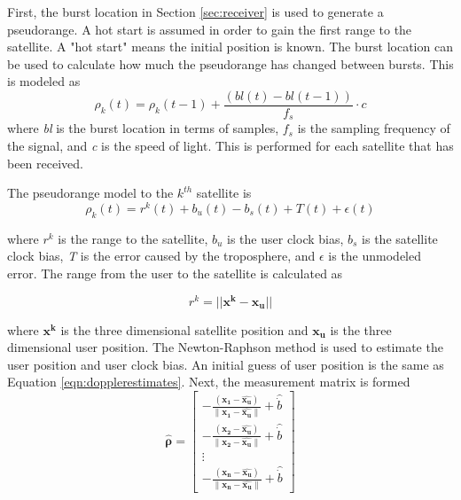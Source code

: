\documentclass[12pt]{report}
\begin{document}
First, the burst location in Section \ref{sec:receiver} is used to generate a pseudorange. A hot start is assumed in order to gain the first range to the satellite. A "hot start" means the initial position is known. The burst location can be used to calculate how much the pseudorange has changed between bursts. This is modeled as 
\begin{equation}
    \rho_{k}(t) = \rho_{k}(t-1) + \frac{(bl(t) - bl(t-1))}{f_s} \cdot c
    \label{eqn:pseudocalc}
\end{equation}
where \textit{bl} is the burst location in terms of samples, $f_s$ is the sampling frequency of the signal, and \textit{c} is the speed of light. This is performed for each satellite that has been received.

The pseudorange model to the $k^{th}$ satellite is 
\begin{equation}
    \rho_k(t) = r^k(t) + b_u(t) - b_s(t) + T(t) + \epsilon(t)
\end{equation}

where $r^k$ is the range to the satellite, $b_u$ is the user clock bias, $b_s$ is the satellite clock bias, \textit{T} is the error caused by the troposphere, and $\epsilon$ is the unmodeled error. The range from the user to the satellite is calculated as 

\begin{equation}
    r^k = || \mathbf{x^k - x_u}||
\end{equation}

where $\mathbf{x^k}$ is the three dimensional satellite position and $\mathbf{x_u}$ is the three dimensional user position. The Newton-Raphson method is used to estimate the user position and user clock bias. An initial guess of user position is the same as Equation \ref{eqn:dopplerestimates}. 
Next, the measurement matrix is formed 
\begin{equation}
    \mathbf{\hat{\rho}} = \begin{bmatrix} 
        -\frac{(\mathbf{x_1} - \mathbf{\hat{x_u}})}{\| \mathbf{x_1} - \mathbf{\hat{x_u}}\|} + \hat{\dot{b}} \\ 
        -\frac{(\mathbf{x_2} - \mathbf{\hat{x_u}})}{\| \mathbf{x_2} - \mathbf{\hat{x_u}}\|} + \hat{\dot{b}} \\ 
        \vdots \\
        -\frac{(\mathbf{x_n} - \mathbf{\hat{x_u}})}{\| \mathbf{x_n} - \mathbf{\hat{x_u}}\|} + \hat{\dot{b}} 
    \end{bmatrix}
    \label{eqn:pseudorangeEstimate}
\end{equation}
\end{document}
